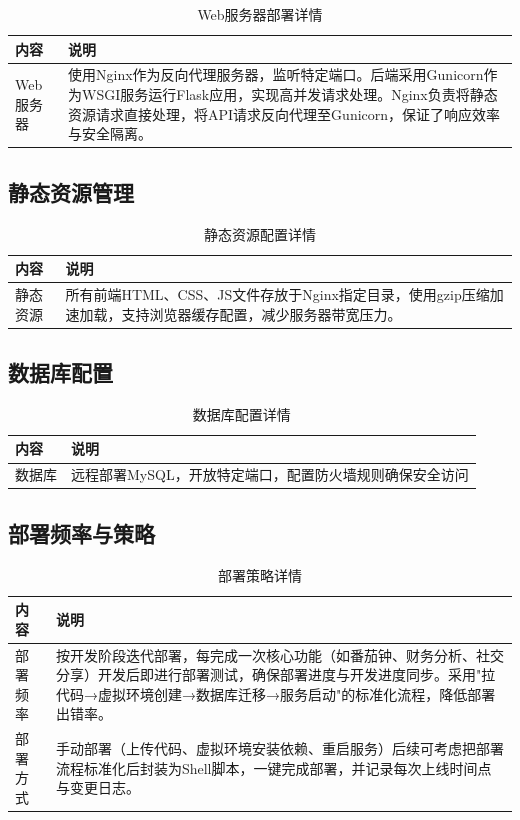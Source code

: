 \documentclass[a4paper]{article}
\begin{document}
\begin{table}[H]
\centering
\caption{Web服务器部署详情}
\begin{tabular}{|p{3cm}|p{12cm}|}
\hline
\textbf{内容} & \textbf{说明} \\
\hline
Web服务器 & 使用Nginx作为反向代理服务器，监听特定端口。后端采用Gunicorn作为WSGI服务运行Flask应用，实现高并发请求处理。Nginx负责将静态资源请求直接处理，将API请求反向代理至Gunicorn，保证了响应效率与安全隔离。 \\
\hline
\end{tabular}
\end{table}

\subsection{静态资源管理}

\begin{table}[H]
\centering
\caption{静态资源配置详情}
\begin{tabular}{|p{3cm}|p{12cm}|}
\hline
\textbf{内容} & \textbf{说明} \\
\hline
静态资源 & 所有前端HTML、CSS、JS文件存放于Nginx指定目录，使用gzip压缩加速加载，支持浏览器缓存配置，减少服务器带宽压力。 \\
\hline
\end{tabular}
\end{table}

\subsection{数据库配置}

\begin{table}[H]
\centering
\caption{数据库配置详情}
\begin{tabular}{|p{3cm}|p{12cm}|}
\hline
\textbf{内容} & \textbf{说明} \\
\hline
数据库 & 远程部署MySQL，开放特定端口，配置防火墙规则确保安全访问 \\
\hline
\end{tabular}
\end{table}

\subsection{部署频率与策略}

\begin{table}[H]
\centering
\caption{部署策略详情}
\begin{tabular}{|p{3cm}|p{12cm}|}
\hline
\textbf{内容} & \textbf{说明} \\
\hline
部署频率 & 按开发阶段迭代部署，每完成一次核心功能（如番茄钟、财务分析、社交分享）开发后即进行部署测试，确保部署进度与开发进度同步。采用"拉代码→虚拟环境创建→数据库迁移→服务启动"的标准化流程，降低部署出错率。 \\
\hline
部署方式 & 手动部署（上传代码、虚拟环境安装依赖、重启服务）后续可考虑把部署流程标准化后封装为Shell脚本，一键完成部署，并记录每次上线时间点与变更日志。 \\
\hline
\end{tabular}
\end{table}
\end{document}
